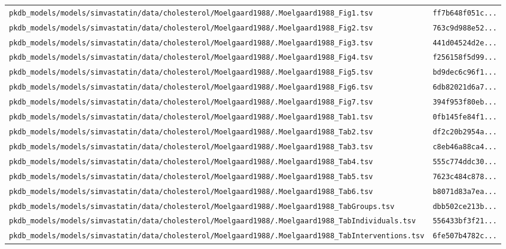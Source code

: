\begin{longtable}{ll}
\texttt{pkdb\_models/models/simvastatin/data/cholesterol/Moelgaard1988/.Moelgaard1988\_Fig1.tsv} & \texttt{ff7b648f051c...} \\
\texttt{pkdb\_models/models/simvastatin/data/cholesterol/Moelgaard1988/.Moelgaard1988\_Fig2.tsv} & \texttt{763c9d988e52...} \\
\texttt{pkdb\_models/models/simvastatin/data/cholesterol/Moelgaard1988/.Moelgaard1988\_Fig3.tsv} & \texttt{441d04524d2e...} \\
\texttt{pkdb\_models/models/simvastatin/data/cholesterol/Moelgaard1988/.Moelgaard1988\_Fig4.tsv} & \texttt{f256158f5d99...} \\
\texttt{pkdb\_models/models/simvastatin/data/cholesterol/Moelgaard1988/.Moelgaard1988\_Fig5.tsv} & \texttt{bd9dec6c96f1...} \\
\texttt{pkdb\_models/models/simvastatin/data/cholesterol/Moelgaard1988/.Moelgaard1988\_Fig6.tsv} & \texttt{6db82021d6a7...} \\
\texttt{pkdb\_models/models/simvastatin/data/cholesterol/Moelgaard1988/.Moelgaard1988\_Fig7.tsv} & \texttt{394f953f80eb...} \\
\texttt{pkdb\_models/models/simvastatin/data/cholesterol/Moelgaard1988/.Moelgaard1988\_Tab1.tsv} & \texttt{0fb145fe84f1...} \\
\texttt{pkdb\_models/models/simvastatin/data/cholesterol/Moelgaard1988/.Moelgaard1988\_Tab2.tsv} & \texttt{df2c20b2954a...} \\
\texttt{pkdb\_models/models/simvastatin/data/cholesterol/Moelgaard1988/.Moelgaard1988\_Tab3.tsv} & \texttt{c8eb46a88ca4...} \\
\texttt{pkdb\_models/models/simvastatin/data/cholesterol/Moelgaard1988/.Moelgaard1988\_Tab4.tsv} & \texttt{555c774ddc30...} \\
\texttt{pkdb\_models/models/simvastatin/data/cholesterol/Moelgaard1988/.Moelgaard1988\_Tab5.tsv} & \texttt{7623c484c878...} \\
\texttt{pkdb\_models/models/simvastatin/data/cholesterol/Moelgaard1988/.Moelgaard1988\_Tab6.tsv} & \texttt{b8071d83a7ea...} \\
\texttt{pkdb\_models/models/simvastatin/data/cholesterol/Moelgaard1988/.Moelgaard1988\_TabGroups.tsv} & \texttt{dbb502ce213b...} \\
\texttt{pkdb\_models/models/simvastatin/data/cholesterol/Moelgaard1988/.Moelgaard1988\_TabIndividuals.tsv} & \texttt{556433bf3f21...} \\
\texttt{pkdb\_models/models/simvastatin/data/cholesterol/Moelgaard1988/.Moelgaard1988\_TabInterventions.tsv} & \texttt{6fe507b4782c...} \\

\end{longtable}
